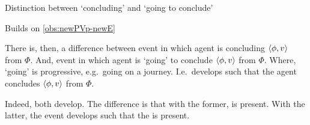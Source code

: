 \begin{note}
  \begin{specification}
    
    Distinction between `concluding' and `going to conclude'
  \end{specification}

  \begin{motivation}
    Builds on \autoref{obs:newPVp-newE}
  \end{motivation}
  {
    \color{red}
    There is, then, a difference between event in which agent is concluding \(\langle \phi, v \rangle\) from \(\Phi\).
    And, event in which agent is `going' to conclude \(\langle \phi, v \rangle\) from \(\Phi\).
    Where, `going' is progressive, e.g.\ going on a journey.
    I.e.\ develops such that the agent concludes \(\langle \phi, v \rangle\) from \(\Phi\).

    Indeed, both develop.
    The difference is that with the former, \pool{} is present.
    With the latter, the event develops such that the \pool{} is present.
  }
\end{note}






